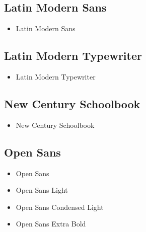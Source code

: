 
    \subsection{Latin Modern Sans}
    \begin{itemize}
    \item {\selectfont Latin Modern Sans}
    \end{itemize}


    \subsection{Latin Modern Typewriter}
    \begin{itemize}
    \item {\selectfont Latin Modern Typewriter}
    \end{itemize}


    \subsection{New Century Schoolbook}
    \begin{itemize}
    \item {\selectfont New Century Schoolbook}
    \end{itemize}


    \subsection{Open Sans}
    \begin{itemize}
        \item {\selectfont Open Sans}
        \item {\selectfont Open Sans Light}
        \item {\selectfont Open Sans Condensed Light}
        \item {\selectfont Open Sans Extra Bold}
    \end{itemize}

